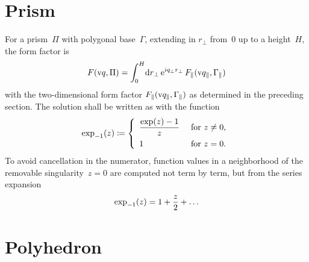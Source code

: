 \section{Prism}\label{SFFPrism}

%
%

For a prism~$\Pi$ with polygonal base~$\Gamma$,
extending in $r_\perp$ from~0 up to a height~$H$,
the form factor is
\begin{equation}
  F(\text{v}{q},\Pi)
  = \int_0^H\!\text{d} r_\perp\,\text{e}^{i q_\perp r_\perp}\,F_\parallel(\text{v}{q}_\parallel,\Gamma_\parallel)
\end{equation}
with the two-dimensional form factor $F_\parallel(\text{v}{q}_\parallel,\Gamma_\parallel)$ as determined in the preceding section.
The solution shall be written as
with the function
\begin{equation}
  \text{exp}_{-1}(z) \coloneqq
  \left\{ \begin{array}{ll}
    \displaystyle \frac{\exp(z)-1}{z}&\text{~for~}z\ne0,\\[1.8ex]
    1&\text{~for~}z=0.
    \end{array}\right.
\end{equation}
To avoid cancellation in the numerator,
function values in a neighborhood of the removable singularity~$z=0$
are computed not term by term,
but from the series expansion
\begin{equation}
  \text{exp}_{-1}(z) = 1 + \frac{z}{2} + \ldots
\end{equation}

%
%

\section{Polyhedron}\label{SFFPolyhedron}

